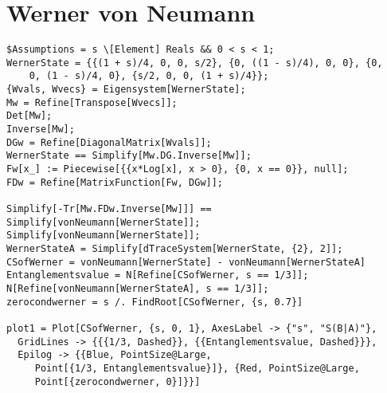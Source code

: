 \section{Werner von Neumann}
\begin{verbatim}
$Assumptions = s \[Element] Reals && 0 < s < 1;
WernerState = {{(1 + s)/4, 0, 0, s/2}, {0, ((1 - s)/4), 0, 0}, {0, 
    0, (1 - s)/4, 0}, {s/2, 0, 0, (1 + s)/4}};
{Wvals, Wvecs} = Eigensystem[WernerState];
Mw = Refine[Transpose[Wvecs]];
Det[Mw];
Inverse[Mw];
DGw = Refine[DiagonalMatrix[Wvals]];
WernerState == Simplify[Mw.DG.Inverse[Mw]];
Fw[x_] := Piecewise[{{x*Log[x], x > 0}, {0, x == 0}}, null];
FDw = Refine[MatrixFunction[Fw, DGw]];

Simplify[-Tr[Mw.FDw.Inverse[Mw]]] == Simplify[vonNeumann[WernerState]];
Simplify[vonNeumann[WernerState]];
WernerStateA = Simplify[dTraceSystem[WernerState, {2}, 2]];
CSofWerner = vonNeumann[WernerState] - vonNeumann[WernerStateA]
Entanglementsvalue = N[Refine[CSofWerner, s == 1/3]];
N[Refine[vonNeumann[WernerStateA], s == 1/3]];
zerocondwerner = s /. FindRoot[CSofWerner, {s, 0.7}]

plot1 = Plot[CSofWerner, {s, 0, 1}, AxesLabel -> {"s", "S(B|A)"}, 
  GridLines -> {{{1/3, Dashed}}, {{Entanglementsvalue, Dashed}}}, 
  Epilog -> {{Blue, PointSize@Large, 
     Point[{1/3, Entanglementsvalue}]}, {Red, PointSize@Large, 
     Point[{zerocondwerner, 0}]}}]
\end{verbatim}
